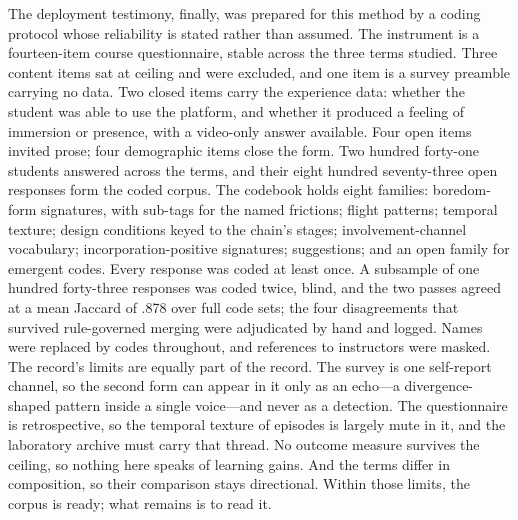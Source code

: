 The deployment testimony, finally, was prepared for this method by a coding protocol whose reliability is stated rather than assumed. The instrument is a fourteen-item course questionnaire, stable across the three terms studied. Three content items sat at ceiling and were excluded, and one item is a survey preamble carrying no data. Two closed items carry the experience data: whether the student was able to use the platform, and whether it produced a feeling of immersion or presence, with a video-only answer available. Four open items invited prose; four demographic items close the form. Two hundred forty-one students answered across the terms, and their eight hundred seventy-three open responses form the coded corpus. The codebook holds eight families: boredom-form signatures, with sub-tags for the named frictions; flight patterns; temporal texture; design conditions keyed to the chain's stages; involvement-channel vocabulary; incorporation-positive signatures; suggestions; and an open family for emergent codes. Every response was coded at least once. A subsample of one hundred forty-three responses was coded twice, blind, and the two passes agreed at a mean Jaccard of .878 over full code sets; the four disagreements that survived rule-governed merging were adjudicated by hand and logged. Names were replaced by codes throughout, and references to instructors were masked. The record's limits are equally part of the record. The survey is one self-report channel, so the second form can appear in it only as an echo---a divergence-shaped pattern inside a single voice---and never as a detection. The questionnaire is retrospective, so the temporal texture of episodes is largely mute in it, and the laboratory archive must carry that thread. No outcome measure survives the ceiling, so nothing here speaks of learning gains. And the terms differ in composition, so their comparison stays directional. Within those limits, the corpus is ready; what remains is to read it.

